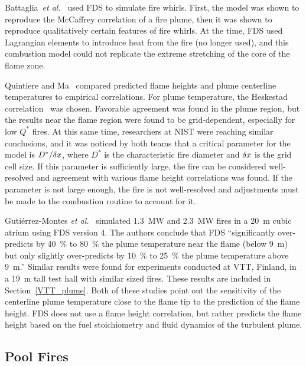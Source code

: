 Battaglia~{\em  et al.}~\cite{Battaglia:1} used  FDS to  simulate fire whirls.   First,  the  model  was  shown to  reproduce  the  McCaffrey
correlation  of  a  fire  plume,   then  it  was  shown  to  reproduce qualitatively certain features  of fire whirls. At the  time, FDS used
Lagrangian elements to introduce heat  from the fire (no longer used), and this  combustion model could not replicate  the extreme stretching of the
core of the flame zone.

Quintiere and Ma~\cite{Ma:2,Ma:3} compared predicted flame heights and plume  centerline temperatures to  empirical correlations.   For plume
temperature,   the  Heskestad   correlation~\cite{SFPE:Heskestad}  was chosen.  Favorable  agreement was found  in the plume region,  but the results
near  the  flame  region  were found  to  be  grid-dependent, especially for  low $Q^*$  fires.  At this  same time,  researchers at NIST were
reaching similar  conclusions, and it  was noticed  by both teams  that a  critical parameter  for the  model is  $D^*/\delta x$, where $D^*$ is the
characteristic fire diameter and $\delta x$  is the grid cell size.  If  this parameter  is  sufficiently  large,  the fire  can  be considered
well-resolved  and  agreement  with various  flame  height correlations was found. If the parameter is not large enough, the fire is not
well-resolved and adjustments  must be made to  the combustion routine to account for it.

Guti\'{e}rrez-Montes {\em et al.}~\cite{Gutierrez:Building_and_Environment} simulated 1.3~MW and 2.3~MW fires in a 20~m cubic atrium using FDS version 4. 
The authors conclude that FDS ``significantly
over-predicts by 40~\% to 80~\% the plume temperature near the flame (below 9~m) but only slightly over-predicts by 10~\% to 25~\% the
plume temperature above 9~m.'' Similar results were found for experiments conducted at VTT, Finland, in a 19~m tall test hall with similar sized fires. These results
are included in Section~\ref{VTT_plume}. Both of these studies point out the sensitivity of the centerline plume temperature close to the flame tip to the prediction of the
flame height. FDS does not use a flame height correlation, but rather predicts the flame height based on the fuel stoichiometry and fluid dynamics of the turbulent plume.



\subsection{Pool Fires}


